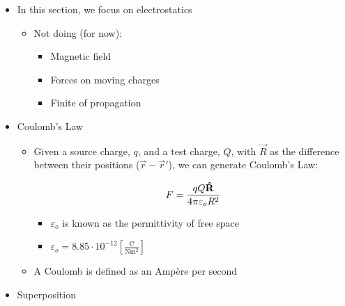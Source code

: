 \begin{itemize}

  \item In this section, we focus on electrostatics

    \begin{itemize}

      \item Not doing (for now):

        \begin{itemize}

          \item Magnetic field

          \item Forces on moving charges

          \item Finite of propagation

        \end{itemize}

    \end{itemize}

  \item Coulomb's Law

    \begin{itemize}

      \item Given a source charge, $q$, and a test charge, $Q$, with $\vec{R}$ as the difference between their positions ($\vec{r}-\vec{r}'$), we can generate Coulomb's Law:

        $$F=\frac{qQ\bold{\hat{R}}}{4\pi\varepsilon_oR^2}$$

        \begin{itemize}

          \item $\varepsilon_o$ is known as the permittivity of free space

          \item $\varepsilon_o=8.85\cdot10^{-12}\left[\frac{\si{\coulomb}}{\si{\newton\meter\squared}}\right]$

        \end{itemize}

      \item A Coulomb is defined as an Amp\`ere per second

    \end{itemize}

  \item Superposition

    \begin{itemize}


\end{itemize}
\end{itemize}
